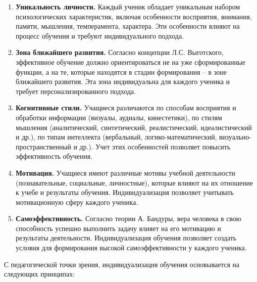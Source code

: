\documentclass[a4paper,14pt]{extreport}
\begin{document}
\begin{enumerate}
    \item \textbf{Уникальность личности.} Каждый ученик обладает уникальным набором психологических характеристик, включая особенности восприятия, внимания, памяти, мышления, темперамента, характера. Эти особенности влияют на процесс обучения и требуют индивидуального подхода.
    
    \item \textbf{Зона ближайшего развития.} Согласно концепции Л.С. Выготского, эффективное обучение должно ориентироваться не на уже сформированные функции, а на те, которые находятся в стадии формирования – в зоне ближайшего развития. Эта зона индивидуальна для каждого ученика и требует персонализированного подхода.
    
    \item \textbf{Когнитивные стили.} Учащиеся различаются по способам восприятия и обработки информации (визуалы, аудиалы, кинестетики), по стилям мышления (аналитический, синтетический, реалистический, идеалистический и др.), по типам интеллекта (вербальный, логико-математический, визуально-пространственный и др.). Учет этих особенностей позволяет повысить эффективность обучения.
    
    \item \textbf{Мотивация.} Учащиеся имеют различные мотивы учебной деятельности (познавательные, социальные, личностные), которые влияют на их отношение к учебе и результаты обучения. Индивидуализация позволяет учитывать мотивационную сферу каждого ученика.
    
    \item \textbf{Самоэффективность.} Согласно теории А. Бандуры, вера человека в свою способность успешно выполнить задачу влияет на его мотивацию и результаты деятельности. Индивидуализация обучения позволяет создать условия для формирования высокой самоэффективности у каждого ученика.
\end{enumerate}

С педагогической точки зрения, индивидуализация обучения основывается на следующих принципах:
\end{document}
